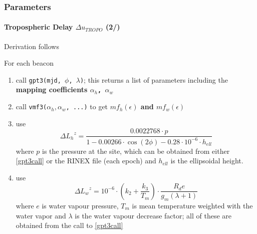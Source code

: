\documentclass{beamer}
\begin{document}
\begin{frame}\frametitle{Parameters}\framesubtitle{Tropospheric Delay \(\Delta u_{TROPO}\) (2/)}
Derivation follows \cite{Landskron2018}

For each beacon
\begin{enumerate}[label=\textbf{T.\arabic*},ref=T.\arabic*]
  \item \label{gpt3call} call \texttt{gpt3(mjd, $\phi$, $\lambda$)}; this returns a 
  list of parameters including the \textbf{mapping coefficients \texttt{$\alpha _h$, $\alpha _w$}}
  
  \item call \texttt{vmf3(\(\alpha _h, \alpha _w\), ...)} to get \textbf{\(mf_h(\epsilon)\) and \(mf_w(\epsilon)\)}
  
  \item use \begin{equation*}
    \Delta {L_{h}}^{z} = \frac{0.0022768 \cdot p}{1-0.00266 \cdot \cos(2\phi) - 0.28 \cdot 10^{-6} \cdot h_{ell}}
  \end{equation*}
  where $p$ is the pressure at the site, which can be obtained from either \ref{gpt3call} 
  or the RINEX file (each epoch) and $h_{ell}$ is the ellipsoidal height.
  
  \item use \begin{equation*}
    \Delta {L_{w}}^{z} = 10^{-6} \cdot ( k_2 + \frac{k_3}{T_m}) \cdot \frac{R_d e}{g_m (\lambda +1)}
  \end{equation*}
  where $e$ is water vapour pressure, $T_m$ is mean 
  temperature weighted with the water vapor and $\lambda$ is the water vapour 
  decrease factor; all of these are obtained from the call to \ref{gpt3call}
\end{enumerate}

\end{frame}

\end{document}
